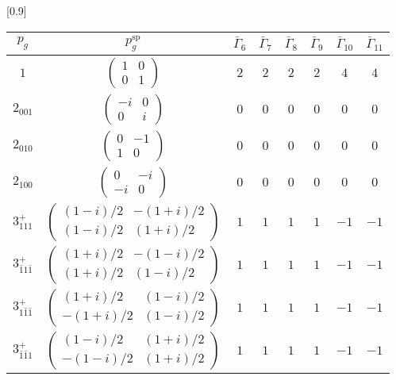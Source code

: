 \documentclass[3p,preprint]{elsarticle}
\begin{document}
\begin{table}[H]
	\scalebox{0.9}[0.9]{
		\begin{tabular}{|c|c||c|c|c|c|c|c|}\hline
			$p_g$ & $p_g^{\text{sp}}$ & $\bar{\Gamma}_6$ & $\bar{\Gamma}_7$ & $\bar{\Gamma}_8$ & $\bar{\Gamma}_9$ & $\bar{\Gamma}_{10}$ & $\bar{\Gamma}_{11}$  \\ \hline \hline
			$1$ & 				$\left(\begin{array}{cc} 1&0 \\ 0&1 \end{array}\right)$	& $2$ &  $2$ &  $2$ &  $2$ &  $4$ &  $4$ \\ \hline
			$2_{001}$ &		$\left(\begin{array}{cc} -i&0 \\ 0&i \end{array}\right)$	& $0$ & $0$ & $0$ & $0$ & $0$ & $0$ \\ \hline
			$2_{010}$ &		$\left(\begin{array}{cc} 0&-1 \\ 1&0 \end{array}\right)$	&$0$ & $0$ & $0$ & $0$ & $0$ & $0$ \\ \hline
			$2_{100}$ &		$\left(\begin{array}{cc} 0&-i \\ -i&0 \end{array}\right)$	& $0$ & $0$ & $0$ & $0$ & $0$ & $0$ \\ \hline
			$3^{+}_{111}$ &		$\left(\begin{array}{cc} (1-i)/2&-(1+i)/2 \\ (1-i)/2&(1+i)/2 \end{array}\right)$	&$1$ & $1$ & $1$ & $1$ & $-1$ & $-1$ \\ \hline
			$3^{+}_{\bar{1}1\bar{1}}$ &		$\left(\begin{array}{cc} (1+i)/2&-(1-i)/2 \\ (1+i)/2&(1-i)/2 \end{array}\right)$	&$1$ & $1$ & $1$ & $1$ & $-1$ & $-1$ \\ \hline
			$3^{+}_{1\bar{1}\bar{1}}$ &		$\left(\begin{array}{cc} (1+i)/2&(1-i)/2 \\ -(1+i)/2&(1-i)/2 \end{array}\right)$	& $1$ & $1$ & $1$ & $1$ & $-1$ & $-1$ \\ \hline
			$3^{+}_{\bar{1}\bar{1}1}$ &		$\left(\begin{array}{cc} (1-i)/2&(1+i)/2 \\ -(1-i)/2&(1+i)/2 \end{array}\right)$	&$1$ & $1$ & $1$ & $1$ & $-1$ & $-1$ \\ \hline

\end{tabular}}
\end{table}
\end{document}
